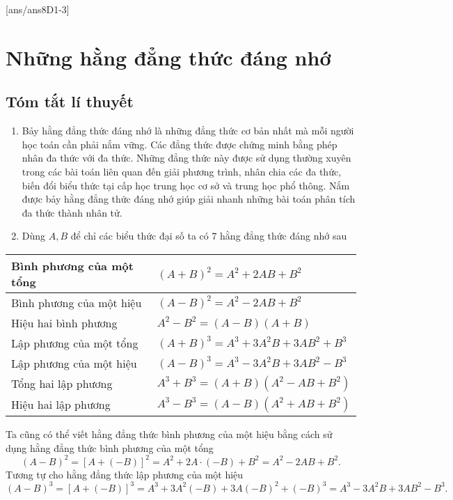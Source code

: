 [ans/ans8D1-3]
\section{Những hằng đẳng thức đáng nhớ}
\subsection{Tóm tắt lí thuyết}
\begin{enumerate}[\tickEX]
	\item Bảy hằng đẳng thức đáng nhớ là những đẳng thức cơ bản nhất mà mỗi người học toán cần phải nắm vững. Các đẳng thức được chứng minh bằng phép nhân đa thức với đa thức. Những đẳng thức này được sử dụng thường xuyên trong các bài toán liên quan đến giải phương trình, nhân chia các đa thức, biến đổi biểu thức tại cấp học trung học cơ sở và trung học phổ thông. Nắm được bảy hằng đẳng thức đáng nhớ giúp giải nhanh những bài toán phân tích đa thức thành nhân tử.
	\item Dùng $A, B$ để chỉ các biểu thức đại số ta có $7$ hằng đẳng thức đáng nhớ sau
\end{enumerate}
\begin{center}
	
	\begin{tabular}{|l|l|}
	\hline 
	Bình phương của một tổng & $(A+B)^2 = A^2 + 2AB + B^2$\\ 
	\hline 
	Bình phương của một hiệu & $(A-B)^2 = A^2 - 2AB + B^2$\\ 
	\hline 
	Hiệu hai bình phương & $A^2 - B^2 = (A-B)(A+B)$\\ 
	\hline 
	Lập phương của một tổng &  $(A+B)^3 = A^3 + 3A^2B + 3AB^2 + B^3$\\ 
	\hline 
	Lập phương của một hiệu & $(A-B)^3 = A^3 - 3A^2B + 3AB^2 - B^3$\\ 
	\hline 
	Tổng hai lập phương & $A^3 + B^3 = (A+B)(A^2 - AB + B^2)$\\ 
	\hline 
	Hiệu hai lập phương & $A^3 - B^3 = (A-B)(A^2 + AB + B^2) $\\ 
	\hline 
\end{tabular}
\end{center} 
\begin{note}
Ta cũng có thể viết hằng đẳng thức bình phương của một hiệu bằng cách sử dụng hằng đẳng thức bình phương của một tổng 
	\[\left(A-B\right)^2 = \left[A+(-B)\right]^2 = A^2 + 2A \cdot (-B) + B^2 = A^2 - 2AB + B^2.\]
	Tương tự cho hằng đẳng thức lập phương của một hiệu
	\[(A-B)^3 = \left[A+(-B)\right]^3 = A^3 + 3A^2(-B) + 3A(-B)^2 + (-B)^3 = A^3 - 3A^2B + 3AB^2 - B^3.\]
\end{note}
